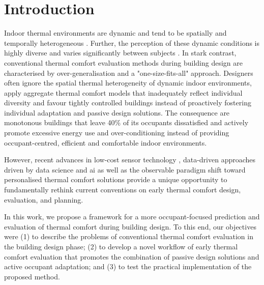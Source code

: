 
\section{Introduction}

Indoor thermal environments are dynamic and tend to be spatially and temporally heterogeneous \citep{Mishra2016, Clements2019, Kim2019}. Further, the perception of these dynamic conditions is highly diverse and varies significantly between subjects \citep{Schweiker2018, Gauthier2020, Mishra2013}. In stark contrast, conventional thermal comfort evaluation methods during building design are characterised by over-generalisation and a "one-size-fits-all" approach. Designers often ignore the spatial thermal heterogeneity of dynamic indoor environments, apply aggregate thermal comfort models that inadequately reflect individual diversity and favour tightly controlled buildings instead of proactively fostering individual adaptation and passive design solutions. The consequence are monotonous buildings \citep{Altomonte2020} that leave 40\% of its occupants dissatisfied \citep{Graham2021} and actively promote excessive energy use and over-conditioning \citep{Parkinson2021, Sekhar2016, DerribleReeder2015} instead of providing occupant-centred, efficient and comfortable indoor environments.

However, recent advances in low-cost sensor technology \citep{Ji2023}, data-driven approaches driven by data science \citep{Abdelrahman2021, LuoNa2021} and \gls{ai} \citep{Ngarambe2020} as well as the observable paradigm shift toward personalised thermal comfort solutions \citep{KimSchiavon2018} provide a unique opportunity to fundamentally rethink current conventions on early thermal comfort design, evaluation, and planning. 

In this work, we propose a framework for a more occupant-focused prediction and evaluation of thermal comfort during building design. To this end, our objectives were (1) to describe the problems of conventional thermal comfort evaluation in the building design phase; (2) to develop a novel workflow of early thermal comfort evaluation that promotes the combination of passive design solutions and active occupant adaptation; and (3) to test the practical implementation of the proposed method.


